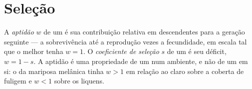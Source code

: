 \section{Seleção}

\begin{definition}[Aptidão]\label{def:b2:population-genetics:fitness}
A \emph{aptidão} $w$ de um  é sua contribuição relativa em
descendentes para a geração seguinte --- a sobrevivência até a
reprodução vezes a fecundidade, em escala tal que o melhor 
tenha $w = 1$. O \emph{coeficiente de seleção} $s$ de um  é seu
déficit, $w = 1 - s$. A aptidão é uma propriedade de um  num
ambiente, e não de um  em si: o  da mariposa melânica tinha
$w > 1$ em relação ao claro sobre a  coberta de fuligem e $w < 1$
sobre os liquens.
\end{definition}

